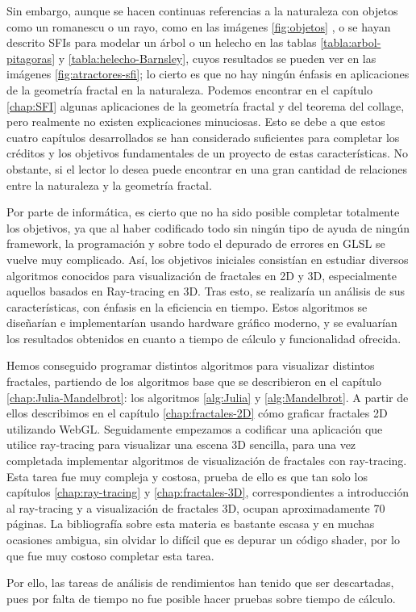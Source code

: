 Sin embargo, aunque se hacen continuas referencias a la naturaleza con objetos como un romanescu o un rayo, como en las imágenes \ref{fig:objetos} , o se hayan descrito SFIs para modelar un árbol o un helecho en las tablas \ref{tabla:arbol-pitagoras} y \ref{tabla:helecho-Barnsley}, cuyos resultados se pueden ver en las imágenes \ref{fig:atractores-sfi}; lo cierto es que no hay ningún énfasis en aplicaciones de la geometría fractal en la naturaleza. Podemos encontrar en el capítulo \ref{chap:SFI} algunas aplicaciones de la geometría fractal y del teorema del collage, pero realmente no existen explicaciones minuciosas. Esto se debe a que estos cuatro capítulos desarrollados se han considerado suficientes para completar los créditos y los objetivos fundamentales de un proyecto de estas características. No obstante, si el lector lo desea puede encontrar en \cite{Mandelbrot} una gran cantidad de relaciones entre la naturaleza y la geometría fractal.

Por parte de informática, es cierto que no ha sido posible completar totalmente los objetivos, ya que al haber codificado todo sin ningún tipo de ayuda de ningún framework, la programación y sobre todo el depurado de errores en GLSL se vuelve muy complicado. Así, los objetivos iniciales consistían en estudiar diversos algoritmos conocidos para visualización de fractales en 2D y 3D, especialmente aquellos basados en Ray-tracing en 3D. Tras esto, se realizaría un análisis de sus características, con énfasis en la eficiencia en tiempo. Estos algoritmos se diseñarían e implementarían usando hardware gráfico moderno, y se evaluarían los resultados obtenidos en cuanto a tiempo de cálculo y funcionalidad ofrecida.

Hemos conseguido programar distintos algoritmos para visualizar distintos fractales, partiendo de los algoritmos base que se describieron en el capítulo \ref{chap:Julia-Mandelbrot}: los algoritmos \ref{alg:Julia} y \ref{alg:Mandelbrot}. A partir de ellos describimos en el capítulo \ref{chap:fractales-2D} cómo graficar fractales 2D utilizando WebGL. Seguidamente empezamos a codificar una aplicación que utilice ray-tracing para visualizar una escena 3D sencilla, para una vez completada implementar algoritmos de visualización de fractales con ray-tracing. Esta tarea fue muy compleja y costosa, prueba de ello es que tan solo los capítulos \ref{chap:ray-tracing} y \ref{chap:fractales-3D}, correspondientes a introducción al ray-tracing y a visualización de fractales 3D, ocupan aproximadamente 70 páginas. La bibliografía sobre esta materia es bastante escasa y en muchas ocasiones ambigua, sin olvidar lo difícil que es depurar un código shader, por lo que fue muy costoso completar esta tarea.

Por ello, las tareas de análisis de rendimientos han tenido que ser descartadas, pues por falta de tiempo no fue posible hacer pruebas sobre tiempo de cálculo.